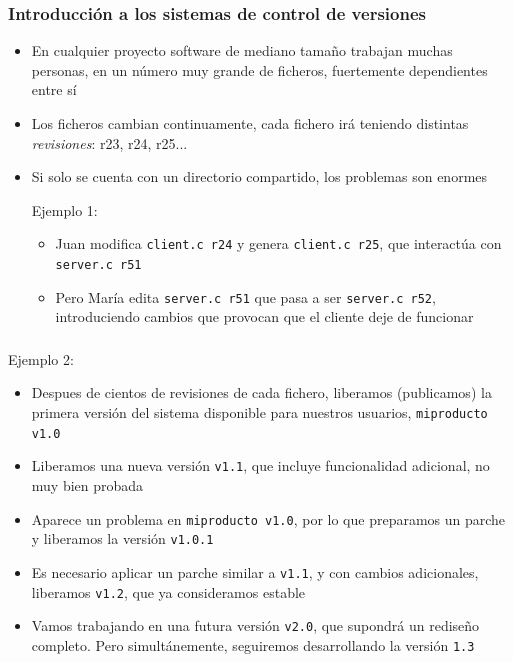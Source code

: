 \documentclass[ucs]{beamer}
\begin{document}
\begin{frame}[fragile]
\frametitle{Introducción a los sistemas de control de versiones}
\begin{itemize}
\item
En cualquier proyecto software de mediano tamaño trabajan muchas personas, en
un número muy grande de
ficheros, fuertemente dependientes entre sí
\item
Los ficheros cambian continuamente, cada fichero irá teniendo distintas
\emph{revisiones}: r23, r24, r25...
\item
Si solo se cuenta con un directorio compartido, los problemas son enormes

Ejemplo 1:
\begin{itemize}
\item
Juan modifica \verb|client.c r24|  y genera \verb|client.c r25|, que interactúa
con \verb|server.c r51|
\item
Pero María edita \verb|server.c r51| que pasa a ser \verb|server.c r52|, introduciendo cambios
que provocan que el cliente deje de funcionar
\end{itemize}
\end{itemize}

\end{frame}


\begin{frame}[fragile]
\frametitle{}
Ejemplo 2:
\begin{itemize}
\item
Despues de cientos de revisiones de cada fichero, liberamos (publicamos) la primera versión
del sistema disponible para nuestros usuarios,
\verb|miproducto v1.0|
\item
Liberamos una nueva versión \verb|v1.1|, que incluye funcionalidad adicional, no 
muy bien probada
\item
Aparece un problema en \verb|miproducto v1.0|, por lo que preparamos un parche y liberamos la versión \verb|v1.0.1|
\item
Es necesario aplicar un parche similar a \verb|v1.1|, y con cambios adicionales, liberamos \verb|v1.2|, que ya consideramos
estable
\item
Vamos trabajando en una futura versión \verb|v2.0|, que supondrá un rediseño completo. Pero simultánemente, seguiremos desarrollando
la versión \verb|1.3|
\end{itemize}

\end{frame}
\end{document}
